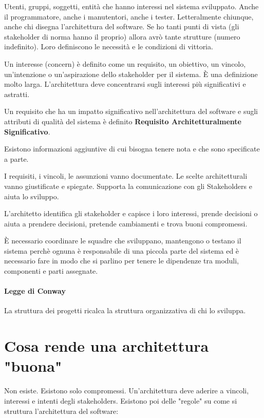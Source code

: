 Utenti, gruppi, soggetti, entit\`a che hanno interessi nel sistema sviluppato. Anche il programmatore, anche i manutentori, anche i tester. Letteralmente chiunque, anche chi disegna l'architettura del software. Se ho tanti punti di vista (gli stakeholder di norma hanno il proprio) allora avr\`o tante strutture (numero indefinito). Loro definiscono le necessit\`a e le condizioni di vittoria.

Un interesse (concern) \`e definito come un requisito, un obiettivo, un vincolo, un'intenzione o un'aspirazione dello stakeholder per il sistema. \`E una definizione molto larga. L'architettura deve concentrarsi sugli interessi pi\`u significativi e astratti.

Un requisito che ha un impatto significativo nell'architettura del software e sugli attributi di qualit\`a del sistema \`e definito \textbf{Requisito Architetturalmente Significativo}.

Esistono informazioni aggiuntive di cui bisogna tenere nota e che sono specificate a parte.

I requisiti, i vincoli, le assunzioni vanno documentate. Le scelte architetturali vanno giustificate e spiegate.
Supporta la comunicazione con gli Stakeholders e aiuta lo sviluppo.

L'architetto identifica gli stakeholder e capisce i loro interessi, prende decisioni o aiuta a prendere decisioni, pretende cambiamenti e trova buoni compromessi.

\`E necessario coordinare le squadre che sviluppano, mantengono o testano il sistema perch\`e ognuna \`e responsabile di una piccola parte del sistema ed \`e necessario fare in modo che si parlino per tenere le dipendenze tra moduli, componenti e parti assegnate.

\paragraph{Legge di Conway}

La struttura dei progetti ricalca la struttura organizzativa di chi lo sviluppa.

\section{Cosa rende una architettura "buona"}

Non esiste. Esistono solo compromessi. Un'architettura deve aderire a vincoli, interessi e intenti degli stakeholders.
Esistono poi delle "regole" su come si struttura l'architettura del software: 

